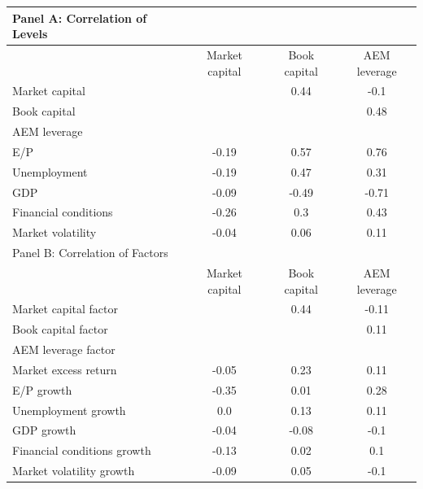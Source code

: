 \documentclass{article}
\begin{document}
    \begin{table}[htbp]
    \centering
    \begin{adjustbox}{max width=\textwidth}
    \small
    \begin{tabular}{lccc}
        \toprule
        Panel A: Correlation of Levels \\
        \midrule
         & Market capital & Book capital & AEM leverage \\
        \midrule
        Market capital &  & 0.44 & -0.1 \\
Book capital &  &  & 0.48 \\
AEM leverage &  &  &  \\
E/P & -0.19 & 0.57 & 0.76 \\
Unemployment & -0.19 & 0.47 & 0.31 \\
GDP & -0.09 & -0.49 & -0.71 \\
Financial conditions & -0.26 & 0.3 & 0.43 \\
Market volatility & -0.04 & 0.06 & 0.11 \\
        \midrule
        Panel B: Correlation of Factors \\
        \midrule
         & Market capital & Book capital & AEM leverage \\
        \midrule
        Market capital factor &  & 0.44 & -0.11 \\
Book capital factor &  &  & 0.11 \\
AEM leverage factor &  &  &  \\
Market excess return & -0.05 & 0.23 & 0.11 \\
E/P growth & -0.35 & 0.01 & 0.28 \\
Unemployment growth & 0.0 & 0.13 & 0.11 \\
GDP growth & -0.04 & -0.08 & -0.1 \\
Financial conditions growth & -0.13 & 0.02 & 0.1 \\
Market volatility growth & -0.09 & 0.05 & -0.1 \\
        \bottomrule
    \end{tabular}
    \end{adjustbox}
    \end{table}
    
\end{document}
